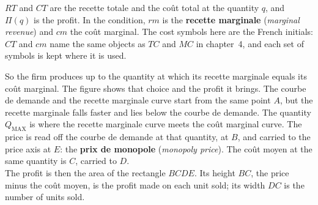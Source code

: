 \begin{notation}
  $RT$ and $CT$ are the recette totale and the coût total at the quantity $q$, and
  $\Pi(q)$ is the profit. In the condition, $rm$ is the \textbf{recette marginale}
  (\textit{marginal revenue}) and $cm$ the coût marginal. The cost symbols here are
  the French initials: $CT$ and $cm$ name the same objects as $TC$ and $MC$ in
  chapter~4, and each set of symbols is kept where it is used.
\end{notation}

So the firm produces up to the quantity at which its recette marginale equals its
coût marginal. The figure shows that choice and the profit it brings. The courbe
de demande and the recette marginale curve start from the same point $A$, but the
recette marginale falls faster and lies below the courbe de demande. The quantity
$Q_{\text{MAX}}$ is where the recette marginale curve meets the coût marginal
curve. The price is read off the courbe de demande at that quantity, at $B$, and
carried to the price axis at $E$: the \textbf{prix de monopole} (\textit{monopoly
price}). The coût moyen at the same
quantity is $C$, carried to $D$.\\

The profit is then the area of the rectangle $BCDE$. Its height $BC$, the price
minus the coût moyen, is the profit made on each unit sold; its width $DC$ is the
number of units sold.

